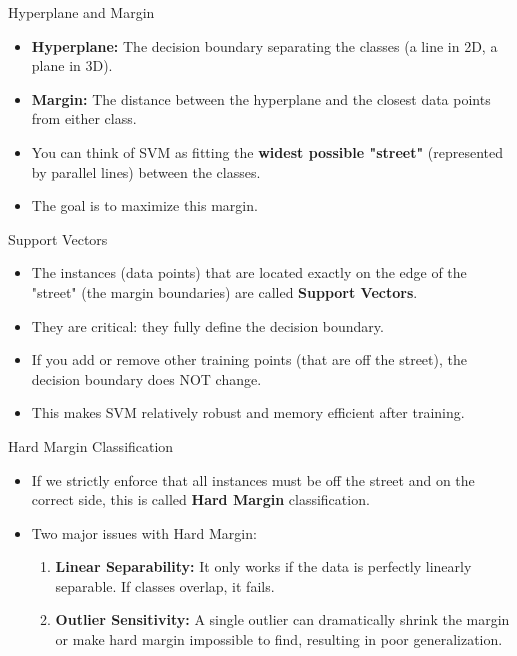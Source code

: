\documentclass[aspectratio=169]{beamer}
\begin{document}
\begin{frame}{Hyperplane and Margin}
\begin{itemize}
    \item \textbf{Hyperplane:} The decision boundary separating the classes (a line in 2D, a plane in 3D).
    \item \textbf{Margin:} The distance between the hyperplane and the closest data points from either class.
    \item You can think of SVM as fitting the \textbf{widest possible "street"} (represented by parallel lines) between the classes.
    \item The goal is to maximize this margin.
\end{itemize}
\end{frame}

\begin{frame}{Support Vectors}
\begin{itemize}
    \item The instances (data points) that are located exactly on the edge of the "street" (the margin boundaries) are called \textbf{Support Vectors}.
    \item They are critical: they fully define the decision boundary.
    \item If you add or remove other training points (that are off the street), the decision boundary does NOT change.
    \item This makes SVM relatively robust and memory efficient after training.
\end{itemize}
\end{frame}

\begin{frame}{Hard Margin Classification}
\begin{itemize}
    \item If we strictly enforce that all instances must be off the street and on the correct side, this is called \textbf{Hard Margin} classification.
    \item Two major issues with Hard Margin:
    \begin{enumerate}
        \item \textbf{Linear Separability:} It only works if the data is perfectly linearly separable. If classes overlap, it fails.
        \item \textbf{Outlier Sensitivity:} A single outlier can dramatically shrink the margin or make hard margin impossible to find, resulting in poor generalization.
    \end{enumerate}
\end{itemize}
\end{frame}
\end{document}
